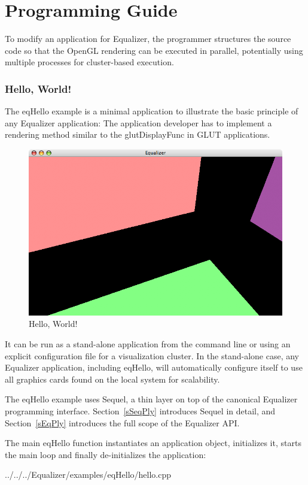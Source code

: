 \documentclass[10pt,a4]{scrartcl}
\newcommand{\sref}[1]{Section~\ref{#1}}
\begin{document}
\clearpage
\part{Programming Guide}

To modify an application for Equalizer, the programmer structures the
source code so that the OpenGL rendering can be executed in parallel,
potentially using multiple processes for cluster-based execution.

\section{\label{sHello}Hello, World!}

The \textsf{eqHello} example is a minimal application to illustrate the basic
principle of any Equalizer application: The application developer has to
implement a rendering method similar to the \textsf{glutDisplayFunc} in GLUT
applications.

\begin{figure}
  \includegraphics[width=.618\textwidth]{images/eqHello.png}
  {\caption{\label{fHello}Hello, World!}}
\end{figure}
It can be run as a stand-alone application from the command line or using an
explicit configuration file for a visualization cluster. In the stand-alone
case, any Equalizer application, including eqHello, will automatically configure
itself to use all graphics cards found on the local system for scalability.

The \textsf{eqHello} example uses Sequel, a thin layer on top of the canonical
Equalizer programming interface. \sref{sSeqPly} introduces Sequel in detail, and
\sref{sEqPly} introduces the full scope of the Equalizer API.

The main \textsf{eqHello} function instantiates an application object,
initializes it, starts the main loop and finally de-initializes the application:

{\footnotesize
  {../../../Equalizer/examples/eqHello/hello.cpp}}
\end{document}
